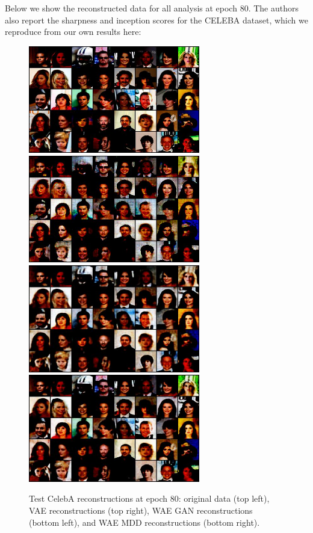 \documentclass[12pt,english]{amsart}
\theoremstyle{definition}
\begin{document}
Below we show the reconstructed data for all analysis at epoch 80. The authors
also report the sharpness and inception scores for the CELEBA dataset, which we
reproduce from our own results here: \\

\begin{figure}[htp]
\centering
\includegraphics[width=75mm]{celeb_vae_ep_79_data}
\includegraphics[width=75mm]{celeb_vae_ep_79_recon}
\includegraphics[width=75mm]{celeb_wae-mmd_ep_79_recon}
\includegraphics[width=75mm]{celeb_wae-gan_ep_79_recon}
\caption{Test CelebA reconstructions at epoch 80: original data (top left), VAE
         reconstructions (top right), WAE GAN reconstructions (bottom left), and
         WAE MDD reconstructions (bottom right).}
\label{Figure 2}
\end{figure}
\end{document}
